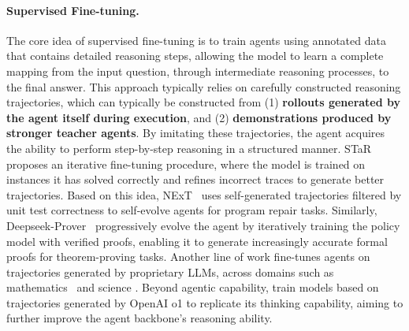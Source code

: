 \documentclass[]{selfevolagent}
\theoremstyle{plain}
\theoremstyle{definition}
\theoremstyle{remark}
\begin{document}
\paragraph{{Supervised Fine-tuning.}}
The core idea of supervised fine-tuning is to train agents using annotated data that contains detailed reasoning steps, allowing the model to learn a complete mapping from the input question, through intermediate reasoning processes, to the final answer. This approach typically relies on carefully constructed reasoning trajectories, which can typically be constructed from (1) \textbf{rollouts generated by the agent itself during execution}, and (2) \textbf{demonstrations produced by stronger teacher agents}. By imitating these trajectories, the agent acquires the ability to perform step-by-step reasoning in a structured manner. 
STaR~\citep{zelikman2022} proposes an iterative fine-tuning procedure, where the model is trained on instances it has solved correctly and refines incorrect traces to generate better trajectories. Based on this idea, NExT~\citep{next} uses self-generated trajectories filtered by unit test correctness to self-evolve agents for program repair tasks. Similarly, Deepseek-Prover~\citep{xin2024deepseek} progressively evolve the agent by iteratively training the policy model with verified proofs, enabling it to generate increasingly accurate formal proofs for theorem-proving tasks. Another line of work fine-tunes agents on trajectories generated by proprietary LLMs, across domains such as mathematics~\citep{tora, yin2024mumath} and science \citep{ma-etal-2024-sciagent}. Beyond agentic capability, \cite{min2024imitate, huang2024o1replicationjourney,bespoke_stratos} train models based on trajectories generated by OpenAI o1 \citep{openai2024openaio1card} to replicate its thinking capability, aiming to further improve the agent backbone's reasoning ability. 

\end{document}
